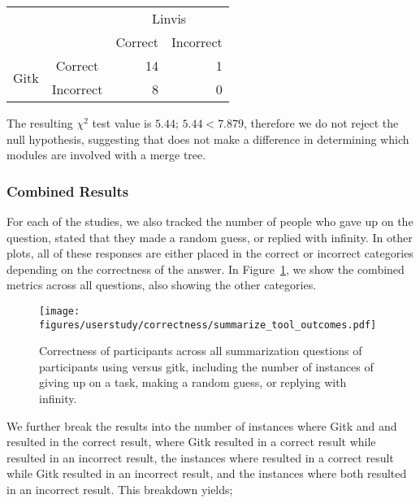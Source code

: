 \begin{center}
  \begin{tabular}{cc|rr}
                            &           & \multicolumn{2}{c}{Linvis}\\
                            &           & Correct                      & Incorrect\\\hline
    \multirow{2}{*}{Gitk}   & Correct   & 14                           & 1\\
                            & Incorrect & 8                            & 0\\
  \end{tabular}
\end{center}

The resulting $\chi^2$ test value is $5.44$; $5.44 < 7.879$, therefore
we do not reject the null hypothesis, suggesting that \tool does not
make a difference in determining which modules are involved with a merge
tree.


\subsubsection{Combined Results}
\label{ssub:combined_results}

For each of the studies, we also tracked the number of people who gave
up on the question, stated that they made a random guess, or replied
with infinity. In other plots, all of these responses are either placed
in the correct or incorrect categories depending on the correctness of
the answer. In Figure~\ref{fig:summarization_correctness}, we show the
combined metrics across all questions, also showing the other
categories.

\begin{figure}[htpb]
  \centering
  \texttt{[image: figures/userstudy/correctness/summarize\_tool\_outcomes.pdf]}
  \caption{Correctness of participants across all summarization
    questions of participants using \tool versus gitk, including the
    number of instances of giving up on a task, making a random guess,
    or replying with infinity.}
  \label{fig:summarization_correctness}
\end{figure}


We further break the results into the number of instances where Gitk and
and \tool resulted in the correct result, where Gitk resulted in a
correct result while \tool resulted in an incorrect result, the
instances where \tool resulted in a correct result while Gitk resulted
in an incorrect result, and the instances where both resulted in an
incorrect result. This breakdown yields;

